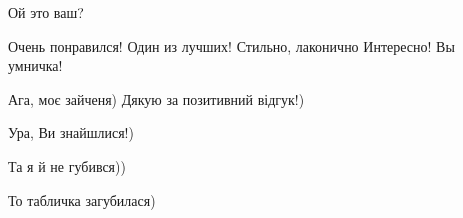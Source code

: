  
 
 
 
 

\qqSecCmt


Ой это ваш?


Очень понравился! Один из лучших! Стильно, лаконично Интересно! Вы умничка!


Ага, моє зайченя) Дякую за позитивний відгук!)


Ура, Ви знайшлися!)

\begin{itemize} %

Та я й не губився))


То табличка загубилася)
\end{itemize} %
